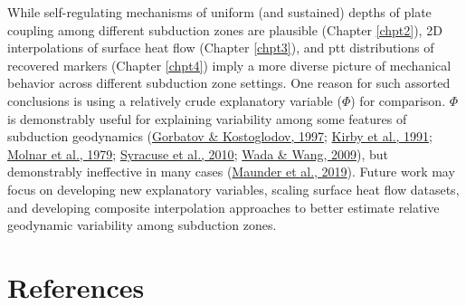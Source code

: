 While self-regulating mechanisms of uniform (and sustained) depths of plate coupling among different subduction zones are plausible (Chapter \ref{chpt2}), 2D interpolations of surface heat flow (Chapter \ref{chpt3}), and \gls{ptt} distributions of recovered markers (Chapter \ref{chpt4}) imply a more diverse picture of mechanical behavior across different subduction zone settings. One reason for such assorted conclusions is using a relatively crude explanatory variable (\(\Phi\)) for comparison. \(\Phi\) is demonstrably useful for explaining variability among some features of subduction geodynamics (\protect\hyperlink{ref-gorbatov1997}{Gorbatov \& Kostoglodov, 1997}; \protect\hyperlink{ref-kirby1991}{Kirby et al., 1991}; \protect\hyperlink{ref-molnar1979}{Molnar et al., 1979}; \protect\hyperlink{ref-syracuse2010}{Syracuse et al., 2010}; \protect\hyperlink{ref-wada2009}{Wada \& Wang, 2009}), but demonstrably ineffective in many cases (\protect\hyperlink{ref-maunder2019}{Maunder et al., 2019}). Future work may focus on developing new explanatory variables, scaling surface heat flow datasets, and developing composite interpolation approaches to better estimate relative geodynamic variability among subduction zones.

\cleardoublepage

\hypertarget{references}{%
\chapter*{References}\label{references}}


